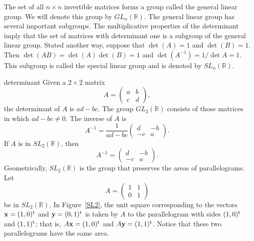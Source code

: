 The set of all $n \times n$  invertible matrices forms a group called
the {\bfi general linear group}.  We will
denote this group by $GL_n({\mathbb R})$.  The general linear group has
several important subgroups. The multiplicative properties of the
determinant imply that the set of matrices with determinant one is a
subgroup of the general linear group.  Stated another way, suppose
that $\det(A) =1$ and $\det(B) = 1$. Then $\det(AB) = \det(A) \det (B)
= 1$ and $\det(A^{-1}) = 1 / \det A = 1$. This subgroup is called the
{\bfi special linear group\/} and is
denoted by $SL_n({\mathbb R})$. 
 
 
\begin{example}{determinant}
Given a $2 \times 2$ matrix
\[
A =
\begin{pmatrix}
a & b \\
c & d
\end{pmatrix},
\]
the determinant of $A$ is \mbox{$ad-bc$}. The group $GL_2({\mathbb R})$
consists of those matrices in which $ad-bc \neq 0$. The inverse of $A$
is 
\[
A^{-1} =
\frac{1}{ad-bc}
\begin{pmatrix}
d & -b \\
-c & a
\end{pmatrix}.
\]
If $A$ is in $SL_2({\mathbb R})$, then
\[
A^{-1} =
\begin{pmatrix}
d & -b \\
-c & a
\end{pmatrix}.
\]
Geometrically, $SL_2({\mathbb R})$ is the group that preserves the areas
of parallelograms.  Let 
\[
A =
\begin{pmatrix}
1 & 1 \\
0 & 1
\end{pmatrix}
\]
be in $SL_2({\mathbb R})$. In Figure~\ref{SL2}, the unit square
corresponding to the vectors ${\mathbf x} = (1,0)^{\rm t}$ and ${\mathbf
y} =  (0,1)^{\rm t}$ is taken  by $A$ to the parallelogram with sides
$(1,0)^{\rm t}$ and $(1, 1)^{\rm t}$; that is, $A {\mathbf x} =
(1,0)^{\rm t}$ and $A {\mathbf y} = (1, 1)^{\rm t}$. Notice that these
two parallelograms have the same area.   
\end{example}
 
